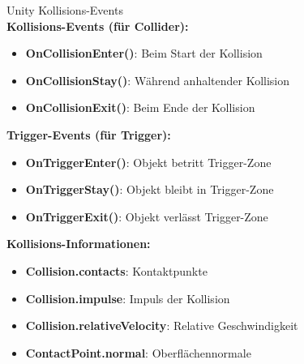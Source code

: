 \begin{definition}{Unity Kollisions-Events}\\
    \textbf{Kollisions-Events (für Collider):}
    \begin{itemize}
        \item \textbf{OnCollisionEnter()}: Beim Start der Kollision
        \item \textbf{OnCollisionStay()}: Während anhaltender Kollision
        \item \textbf{OnCollisionExit()}: Beim Ende der Kollision
    \end{itemize}
    
    \textbf{Trigger-Events (für Trigger):}
    \begin{itemize}
        \item \textbf{OnTriggerEnter()}: Objekt betritt Trigger-Zone
        \item \textbf{OnTriggerStay()}: Objekt bleibt in Trigger-Zone
        \item \textbf{OnTriggerExit()}: Objekt verlässt Trigger-Zone
    \end{itemize}
    
    \textbf{Kollisions-Informationen:}
    \begin{itemize}
        \item \textbf{Collision.contacts}: Kontaktpunkte
        \item \textbf{Collision.impulse}: Impuls der Kollision
        \item \textbf{Collision.relativeVelocity}: Relative Geschwindigkeit
        \item \textbf{ContactPoint.normal}: Oberflächennormale
    \end{itemize}
\end{definition}

